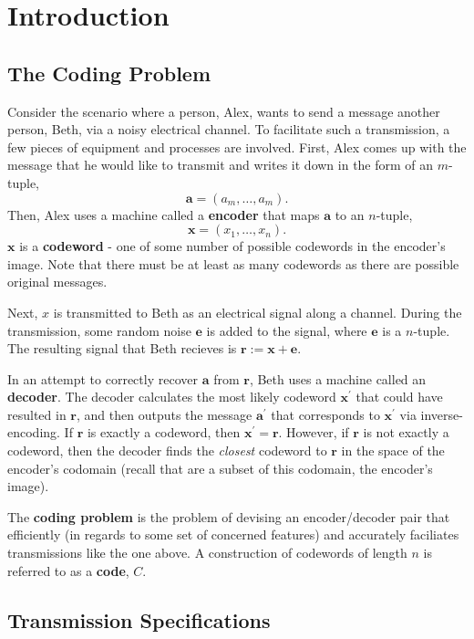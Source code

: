 \documentclass{article}
\renewcommand{\=}{\equiv}
\newcommand{\p}{^\prime}
\renewcommand{\v}{\mathbf}
\newcommand{\x}{{\v x}}
\theoremstyle{plain}
\theoremstyle{definition}
\begin{document}
\section{Introduction}

\subsection{The Coding Problem}
Consider the scenario where a person, Alex, wants to send a message another person, Beth, via a noisy electrical channel.
To facilitate such a transmission, a few pieces of equipment and processes are involved.
First, Alex comes up with the message that he would like to transmit and writes it down in the form of an $m$-tuple,
$$ \v a = (a_m, \dots, a_m). $$
Then, Alex uses a machine called a \textbf{encoder} that maps $\v a$ to an $n$-tuple,
$$ \x = (x_1, \dots, x_n). $$
$\x$ is a \textbf{codeword} - one of some number of possible codewords in the encoder's image.
Note that there must be at least as many codewords as there are possible original messages.

Next, $x$ is transmitted to Beth as an electrical signal along a channel.
During the transmission, some random noise $\v e$ is added to the signal, where $\v e$ is a $n$-tuple.
The resulting signal that Beth recieves is $\v r := \x + \v e$.

In an attempt to correctly recover $\v a$ from $\v r$, Beth uses a machine called an \textbf{decoder}.
The decoder calculates the most likely codeword $\x\p$ that could have resulted in $\v r$,
and then outputs the message $\v a\p$ that corresponds to $\x\p$ via inverse-encoding.
If $\v r$ is exactly a codeword, then $\x\p = \v r$.
However, if $\v r$ is not exactly a codeword, then the decoder finds the \textit{closest} codeword to $\v r$ in the space of the encoder's codomain (recall that are a subset of this codomain, the encoder's image).

The \textbf{coding problem} is the problem of devising an encoder/decoder pair that efficiently (in regards to some set of concerned features) and accurately faciliates transmissions like the one above. A construction of codewords of length $n$ is referred to as a \textbf{code}, $C$.

\subsection{Transmission Specifications}
\label{sec:trans-spec}
\end{document}
